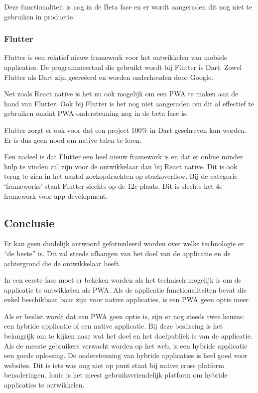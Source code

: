			Deze functionaliteit is nog in de Beta fase en er wordt aangeraden dit nog niet te gebruiken in productie.
			
			\autocite{Expo2020}


	\subsubsection{Flutter}
		Flutter \autocite{Flutter2020} is een relatief nieuw framework voor het ontwikkelen van mobiele applicaties. De programmeertaal die gebruikt wordt bij Flutter is Dart. Zowel Flutter als Dart zijn gecreëerd en worden onderhouden door Google. 
		
		Net zoals React native is het nu ook mogelijk om een PWA te maken aan de hand van Flutter. Ook bij Flutter is het nog niet aangeraden om dit al effectief te gebruiken omdat PWA-ondersteuning nog in de beta fase is. 
		
		Flutter zorgt er ook voor dat een project 100\% in Dart geschreven kan worden. Er is dus geen nood om native talen te leren. 
		
		Een nadeel is dat Flutter een heel nieuw framework is en dat er online minder hulp te vinden zal zijn voor de ontwikkelaar dan bij React native. Dit is ook terug te zien in het aantal zoekopdrachten op stackoverflow. Bij de categorie ‘frameworks’ staat Flutter slechts op de 12e plaats. Dit is slechts het 4e framework voor app development.
		\autocite{StackOverflow2020}
		
\subsection{Conclusie}

Er kan geen duidelijk antwoord geformuleerd worden over welke technologie er “de beste” is. Dit zal steeds afhangen van het doel van de applicatie en de achtergrond die de ontwikkelaar heeft.


In een eerste fase moet er  bekeken worden als het technisch mogelijk is om de applicatie te ontwikkelen als PWA. Als de applicatie functionaliteiten bevat die enkel beschikbaar baar zijn voor native applicaties, is een PWA geen optie meer.

Als er beslist wordt dat een PWA geen optie is, zijn er nog steeds twee keuzes: een hybride applicatie of een native applicatie. Bij deze beslissing is het belangrijk om te kijken naar wat het doel en het doelpubliek is van de applicatie. Als de meeste gebruikers verwacht worden op het web, is een hybride applicatie een goede oplossing. De ondersteuning van hybride applicaties is heel goed voor websites. Dit is iets was nog niet op punt staat bij native cross platform benaderingen. Ionic is het meest gebruiksvriendelijk platform om hybride applicaties te ontwikkelen.

